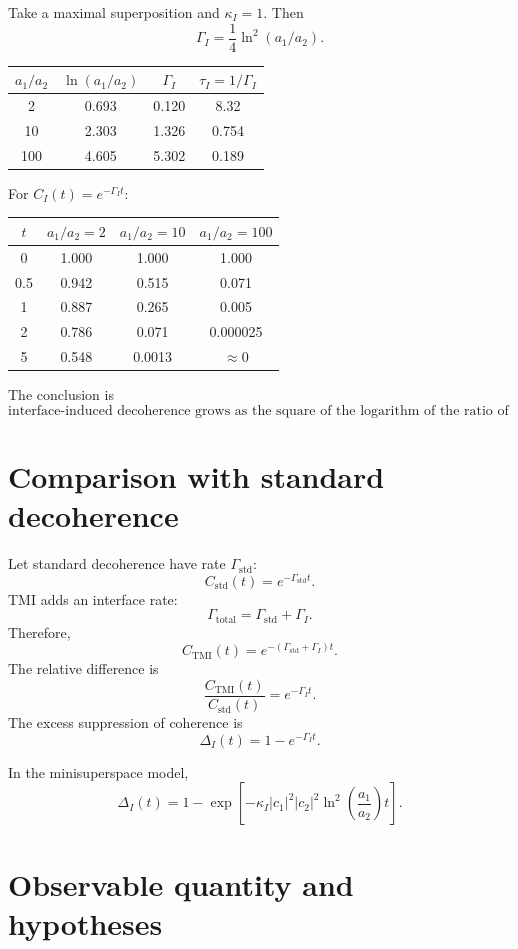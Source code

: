 \documentclass[12pt,a4paper]{article}
\newcommand{\std}{\mathrm{std}}
\begin{document}
Take a maximal superposition and \(\kappa_I=1\). Then
\[
\Gamma_I=\frac14\ln^2(a_1/a_2).
\]

\begin{center}
\begin{tabular}{cccc}
\toprule
\(a_1/a_2\) & \(\ln(a_1/a_2)\) & \(\Gamma_I\) & \(\tau_I=1/\Gamma_I\)\\
\midrule
2 & 0.693 & 0.120 & 8.32\\
10 & 2.303 & 1.326 & 0.754\\
100 & 4.605 & 5.302 & 0.189\\
\bottomrule
\end{tabular}
\end{center}

For \(C_I(t)=e^{-\Gamma_I t}\):
\begin{center}
\begin{tabular}{cccc}
\toprule
\(t\) & \(a_1/a_2=2\) & \(a_1/a_2=10\) & \(a_1/a_2=100\)\\
\midrule
0 & 1.000 & 1.000 & 1.000\\
0.5 & 0.942 & 0.515 & 0.071\\
1 & 0.887 & 0.265 & 0.005\\
2 & 0.786 & 0.071 & 0.000025\\
5 & 0.548 & 0.0013 & \(\approx0\)\\
\bottomrule
\end{tabular}
\end{center}

The conclusion is
\[
\boxed{
\text{interface-induced decoherence grows as the square of the logarithm of the ratio of geometric scales.}
}
\]

\section{Comparison with standard decoherence}

Let standard decoherence have rate \(\Gamma_{\std}\):
\[
C_{\std}(t)=e^{-\Gamma_{\std}t}.
\]
TMI adds an interface rate:
\[
\Gamma_{\mathrm{total}}=\Gamma_{\std}+\Gamma_I.
\]
Therefore,
\[
C_{\mathrm{TMI}}(t)=e^{-(\Gamma_{\std}+\Gamma_I)t}.
\]
The relative difference is
\[
\frac{C_{\mathrm{TMI}}(t)}{C_{\std}(t)}=e^{-\Gamma_I t}.
\]
The excess suppression of coherence is
\[
\boxed{
\Delta_I(t)=1-e^{-\Gamma_I t}.
}
\]

In the minisuperspace model,
\[
\boxed{
\Delta_I(t)=1-
\exp\left[-
\kappa_I |c_1|^2|c_2|^2
\ln^2\left(\frac{a_1}{a_2}\right)t
\right].
}
\]

\section{Observable quantity and hypotheses}
\end{document}
